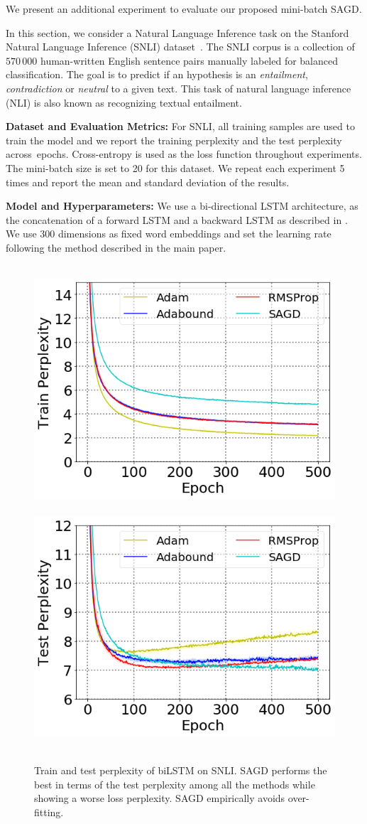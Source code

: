 We present an additional experiment to evaluate our proposed mini-batch \textsc{SAGD}.

In this section, we consider a Natural Language Inference task on the Stanford Natural Language Inference (SNLI) dataset~\citep{bowman2015large}. 
The SNLI corpus is a collection of $570 \, 000$ human-written English sentence pairs manually labeled for balanced classification.
The goal is to predict if an hypothesis is an \emph{entailment}, \emph{contradiction} or \emph{neutral} to a given text.
This task of natural language inference (NLI) is also known as recognizing textual entailment. 

\textbf{Dataset and Evaluation Metrics:} 
For SNLI, all training samples are used to train the model and we report the training perplexity and the test perplexity across~epochs. 
Cross-entropy is used as the loss function throughout experiments. 
The mini-batch size is set to 20 for this dataset. 
We repeat each experiment 5 times and report the mean and standard deviation of the results.



\textbf{Model and Hyperparameters:} 
We use a bi-directional LSTM architecture, as the concatenation of a forward LSTM and a backward LSTM as described in \citep{conneau2017supervised}.
We use 300 dimensions as fixed word embeddings and set the learning rate following the method described in the main paper.


\begin{figure}[H] 
 \mbox{
\includegraphics[width = 0.48 \textwidth ]{figure/bilstmtrain.png}
\includegraphics[width = 0.48 \textwidth ]{figure/bilstmtest.png}
 }
 \vspace{-0.1in}
 \caption[]{Train and test perplexity of biLSTM on SNLI. 
 \textsc{SAGD} performs the best in terms of the test perplexity among all the methods while showing a worse loss perplexity. SAGD empirically avoids over-fitting.
} 
 \label{fig:snli}\vspace{-0.05in}
\end{figure}

